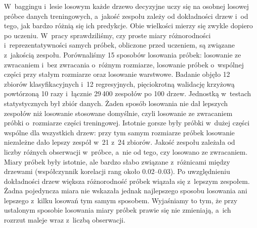 W~baggingu i~lesie losowym każde drzewo decyzyjne uczy się na osobnej losowej próbce danych treningowych, a~jakość zespołu zależy od dokładności drzew i~od tego, jak bardzo różnią się ich predykcje. Obie wielkości mierzy się zwykle dopiero po uczeniu. W~pracy sprawdziliśmy, czy proste miary różnorodności i~reprezentatywności samych próbek, obliczone przed uczeniem, są związane z~jakością zespołu. Porównaliśmy 15 sposobów losowania próbek: losowanie ze zwracaniem i~bez zwracania o~różnym rozmiarze, losowanie próbek o~wspólnej części przy stałym rozmiarze oraz losowanie warstwowe. Badanie objęło 12 zbiorów klasyfikacyjnych i~12 regresyjnych, pięciokrotną walidację krzyżową powtórzoną 10 razy i~łącznie 29\,400 zespołów po 100 drzew. Jednostką w~testach statystycznych był zbiór danych. Żaden sposób losowania nie dał lepszych zespołów niż losowanie stosowane domyślnie, czyli losowanie ze zwracaniem próbki o~rozmiarze części treningowej. Istotnie gorsze były próbki w~dużej części wspólne dla wszystkich drzew: przy tym samym rozmiarze próbek losowanie niezależne dało lepszy zespół w~21 z~24 zbiorów. Jakość zespołu zależała od liczby różnych obserwacji w~próbce, a~nie od tego, czy losowano ze zwracaniem. Miary próbek były istotnie, ale bardzo słabo związane z~różnicami między drzewami (współczynnik korelacji rang około 0.02--0.03). Po uwzględnieniu dokładności drzew większa różnorodność próbek wiązała się z~lepszym zespołem. Żadna pojedyncza miara nie wskazała jednak najlepszego sposobu losowania ani lepszego z~kilku losowań tym samym sposobem. Wyjaśniamy to tym, że przy ustalonym sposobie losowania miary próbek prawie się nie zmieniają, a~ich rozrzut maleje wraz z~liczbą obserwacji.
